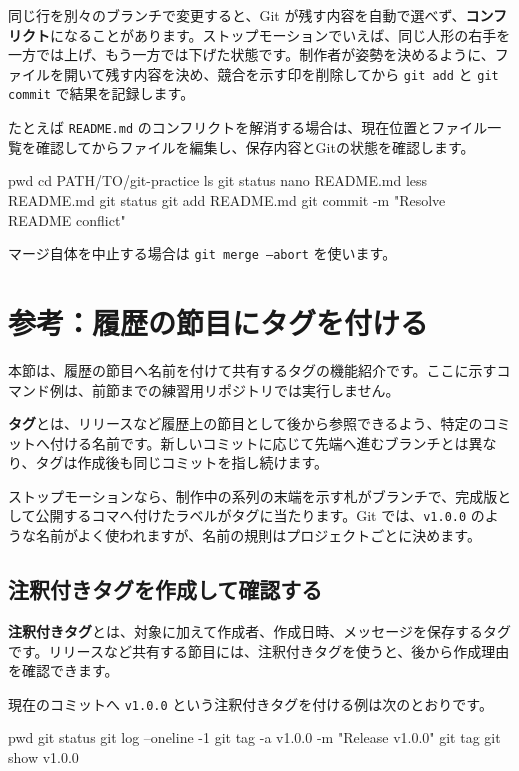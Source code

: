 \documentclass[a4paper,11pt]{jlreq}
\newcommand{\cmd}[1]{\texttt{#1}}
\newcommand{\term}[1]{\textbf{#1}}
\begin{document}
同じ行を別々のブランチで変更すると、Git が残す内容を自動で選べず、\term{コンフリクト}になることがあります。ストップモーションでいえば、同じ人形の右手を一方では上げ、もう一方では下げた状態です。制作者が姿勢を決めるように、ファイルを開いて残す内容を決め、競合を示す印を削除してから \cmd{git add} と \cmd{git commit} で結果を記録します。

たとえば \cmd{README.md} のコンフリクトを解消する場合は、現在位置とファイル一覧を確認してからファイルを編集し、保存内容とGitの状態を確認します。

\begin{codeblock}
pwd
cd PATH/TO/git-practice
ls
git status
nano README.md
less README.md
git status
git add README.md
git commit -m "Resolve README conflict"
\end{codeblock}

マージ自体を中止する場合は \cmd{git merge --abort} を使います。

\section{参考：履歴の節目にタグを付ける}

本節は、履歴の節目へ名前を付けて共有するタグの機能紹介です。ここに示すコマンド例は、前節までの練習用リポジトリでは実行しません。

\term{タグ}とは、リリースなど履歴上の節目として後から参照できるよう、特定のコミットへ付ける名前です。新しいコミットに応じて先端へ進むブランチとは異なり、タグは作成後も同じコミットを指し続けます。

ストップモーションなら、制作中の系列の末端を示す札がブランチで、完成版として公開するコマへ付けたラベルがタグに当たります。Git では、\cmd{v1.0.0} のような名前がよく使われますが、名前の規則はプロジェクトごとに決めます。

\subsection{注釈付きタグを作成して確認する}

\term{注釈付きタグ}とは、対象に加えて作成者、作成日時、メッセージを保存するタグです。リリースなど共有する節目には、注釈付きタグを使うと、後から作成理由を確認できます。

現在のコミットへ \cmd{v1.0.0} という注釈付きタグを付ける例は次のとおりです。

\begin{codeblock}
pwd
git status
git log --oneline -1
git tag -a v1.0.0 -m "Release v1.0.0"
git tag
git show v1.0.0
\end{codeblock}
\end{document}
